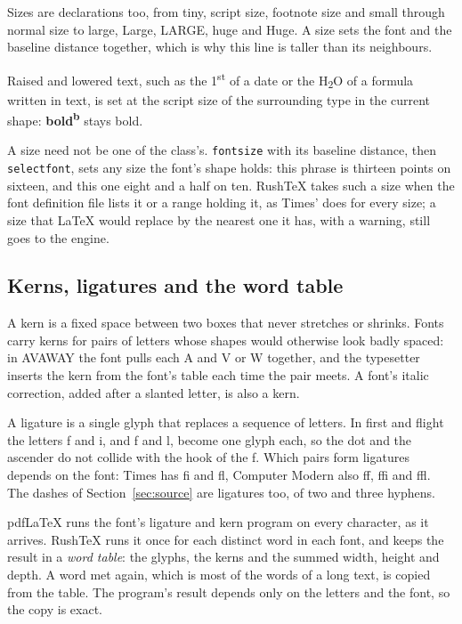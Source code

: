 \documentclass{article}
\numberwithin{equation}{section}
\theoremstyle{definition}
\theoremstyle{remark}
\begin{document}
Sizes are declarations too, from {\tiny tiny}, {\scriptsize script size},
{\footnotesize footnote size} and {\small small} through {\normalsize normal size} to
{\large large}, {\Large Large}, {\LARGE LARGE}, {\huge huge} and {\Huge Huge}. A size
sets the font and the baseline distance together, which is why this line is taller than
its neighbours.

Raised and lowered text, such as the 1\textsuperscript{st} of a date or the
H\textsubscript{2}O of a formula written in text, is set at the script size of the
surrounding type in the current shape: \textbf{bold\textsuperscript{b}} stays bold.

A size need not be one of the class's. \texttt{fontsize} with its baseline distance,
then \texttt{selectfont}, sets any size the font's shape holds:
{\fontsize{13}{16}\selectfont this phrase is thirteen points on sixteen,} and
{\fontsize{8.5}{10}\selectfont this one eight and a half on ten.} RushTeX takes such a
size when the font definition file lists it or a range holding it, as Times' does for
every size; a size that \LaTeX{} would replace by the nearest one it has, with a warning,
still goes to the engine.

\subsection{Kerns, ligatures and the word table}\label{sec:spacing}

A kern is a fixed space between two boxes that never stretches or shrinks. Fonts carry
kerns for pairs of letters whose shapes would otherwise look badly spaced: in AVAWAY the
font pulls each A and V or W together, and the typesetter inserts the kern from the
font's table each time the pair meets. A font's italic correction, added after a slanted
letter, is also a kern.

A ligature is a single glyph that replaces a sequence of letters. In first and flight
the letters f and i, and f and l, become one glyph each, so the dot and the ascender do
not collide with the hook of the f. Which pairs form ligatures depends on the font:
Times has fi and fl, Computer Modern also ff, ffi and ffl. The dashes of
Section~\ref{sec:source} are ligatures too, of two and three hyphens.

pdfLaTeX runs the font's ligature and kern program on every character, as it arrives.
RushTeX runs it once for each distinct word in each font, and keeps the result in a
\emph{word table}: the glyphs, the kerns and the summed width, height and depth. A word
met again, which is most of the words of a long text, is copied from the table. The
program's result depends only on the letters and the font, so the copy is exact.
\end{document}
